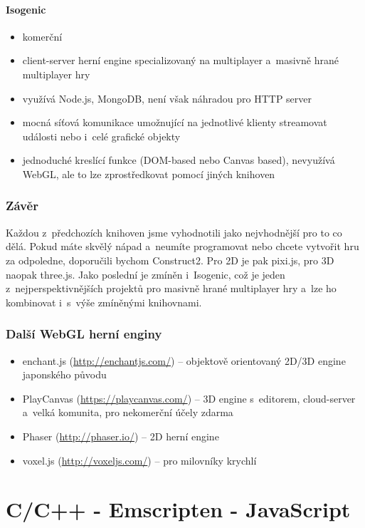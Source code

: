 \documentclass[12pt,a4paper,titlepage,final]{report}
\begin{document}
\paragraph{Isogenic} \cite{isogenic}

\begin{itemize}
	\item komerční
	\item client-server herní engine specializovaný na multiplayer a~masivně hrané multiplayer hry
	\item využívá Node.js, MongoDB, není však náhradou pro HTTP server
	\item mocná síťová komunikace umožnující na jednotlivé klienty streamovat události nebo i~celé grafické objekty
	\item jednoduché kreslící funkce (DOM-based nebo Canvas based), nevyužívá WebGL, ale to lze zprostředkovat pomocí jiných knihoven
\end{itemize}

\subsubsection{Závěr}

Každou z~předchozích knihoven jsme vyhodnotili jako nejvhodnější pro to co dělá. Pokud máte skvělý nápad a~neumíte programovat nebo chcete vytvořit hru za odpoledne, doporučili bychom Construct2. Pro 2D je pak pixi.js, pro 3D naopak three.js. Jako poslední je zmíněn i~Isogenic, což je jeden z~nejperspektivnějších projektů pro masivně hrané multiplayer hry a~lze ho kombinovat i~s~výše zmíněnými knihovnami.

\subsubsection{Další WebGL herní enginy}
\begin{itemize}
	\item enchant.js (\url{http://enchantjs.com/}) -- objektově orientovaný 2D/3D engine japonského původu
	\item PlayCanvas (\url{https://playcanvas.com/}) -- 3D engine s~editorem, cloud-server a~velká komunita, pro nekomerční účely zdarma
	\item Phaser (\url{http://phaser.io/}) -- 2D herní engine
	\item voxel.js (\url{http://voxeljs.com/}) -- pro milovníky krychlí
\end{itemize}

\section{C/C++ - Emscripten - JavaScript}
\end{document}
